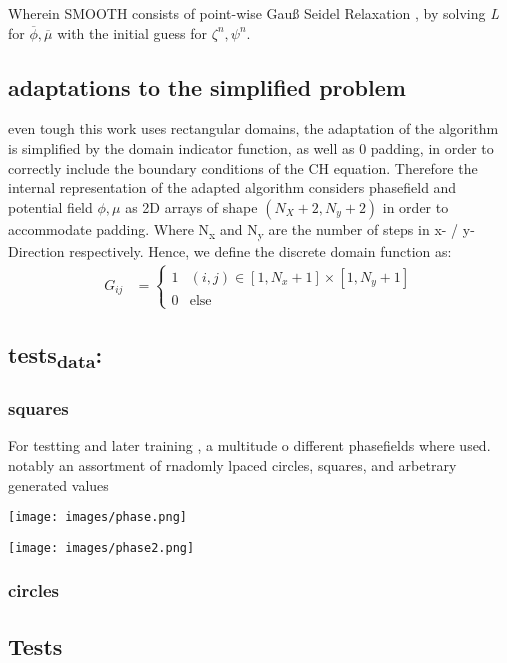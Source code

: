 \documentclass[11pt]{article}
\begin{document}
Wherein SMOOTH consists of point-wise Gauß Seidel Relaxation , by solving \emph{L} for \(\overline{\phi} ,\overline{\mu}\) with the initial guess for \(\zeta^n , \psi^n\).
\subsection{adaptations to the simplified problem}
\label{sec:orgacd84ac}
even tough this work uses rectangular domains, the adaptation of the algorithm is simplified by the domain indicator function, as well as 0 padding, in order to correctly include the boundary conditions of the CH equation.
Therefore the internal representation of the adapted algorithm considers phasefield and potential field \(\phi , \mu\) as 2D arrays of shape \((N_X + 2 , N_y + 2)\) in order to accommodate padding. Where N\textsubscript{x} and N\textsubscript{y} are the number of steps in x- / y-Direction respectively.
Hence, we define the discrete domain function as:
\begin{align*}
G_{ij} &=
\begin{cases}
1 & (i,j) \in  [1,N_x+1] \times  [1,N_y+1] \\
0 & \text{else}
\end{cases}
\end{align*}
\subsection{tests\textsubscript{data}:}
\label{sec:orge99537c}
\subsubsection{squares}
\label{sec:org02028f8}
For testting and later training , a multitude o different phasefields where used. notably an assortment of rnadomly lpaced circles, squares, and arbetrary generated values
\begin{center}
\texttt{[image: images/phase.png]}
\end{center}



\begin{center}
\texttt{[image: images/phase2.png]}
\end{center}
\subsubsection{circles}
\label{sec:org361bde6}
\subsection{Tests}
\label{sec:orgd47c532}
\end{document}
